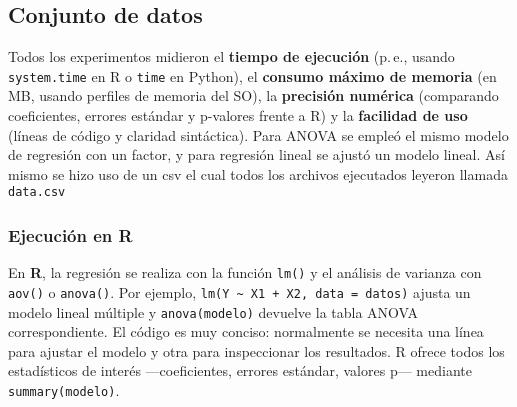 \documentclass[
  letterpaper,
  DIV=11,
  numbers=noendperiod]{scrartcl}
\newenvironment{Shaded}{\begin{snugshade}}{\end{snugshade}}
\newcommand{\AttributeTok}[1]{\textcolor[rgb]{0.40,0.45,0.13}{#1}}
\newcommand{\CommentTok}[1]{\textcolor[rgb]{0.37,0.37,0.37}{#1}}
\newcommand{\DecValTok}[1]{\textcolor[rgb]{0.68,0.00,0.00}{#1}}
\newcommand{\FunctionTok}[1]{\textcolor[rgb]{0.28,0.35,0.67}{#1}}
\newcommand{\NormalTok}[1]{\textcolor[rgb]{0.00,0.23,0.31}{#1}}
\newcommand{\OtherTok}[1]{\textcolor[rgb]{0.00,0.23,0.31}{#1}}
\newcommand{\SpecialCharTok}[1]{\textcolor[rgb]{0.37,0.37,0.37}{#1}}
\newcommand{\StringTok}[1]{\textcolor[rgb]{0.13,0.47,0.30}{#1}}
\begin{document}
\subsection{Conjunto de datos}\label{conjunto-de-datos}

Todos los experimentos midieron el \textbf{tiempo de ejecución} (p.\,e.,
usando \texttt{system.time} en R o \texttt{time} en Python), el
\textbf{consumo máximo de memoria} (en MB, usando perfiles de memoria
del SO), la \textbf{precisión numérica} (comparando coeficientes,
errores estándar y p-valores frente a R) y la \textbf{facilidad de uso}
(líneas de código y claridad sintáctica). Para ANOVA se empleó el mismo
modelo de regresión con un factor, y para regresión lineal se ajustó un
modelo lineal. Así mismo se hizo uso de un csv el cual todos los
archivos ejecutados leyeron llamada \texttt{data.csv}

\subsubsection{\texorpdfstring{\textbf{Ejecución en
R}}{Ejecución en R}}\label{ejecuciuxf3n-en-r}

En \textbf{R}, la regresión se realiza con la función \texttt{lm()} y el
análisis de varianza con \texttt{aov()} o \texttt{anova()}. Por ejemplo,
\texttt{lm(Y\ \textasciitilde{}\ X1\ +\ X2,\ data\ =\ datos)} ajusta un
modelo lineal múltiple y \texttt{anova(modelo)} devuelve la tabla ANOVA
correspondiente. El código es muy conciso: normalmente se necesita una
línea para ajustar el modelo y otra para inspeccionar los resultados. R
ofrece todos los estadísticos de interés ---coeficientes, errores
estándar, valores p--- mediante \texttt{summary(modelo)}.

\begin{Shaded}
\end{Shaded}
\end{document}
